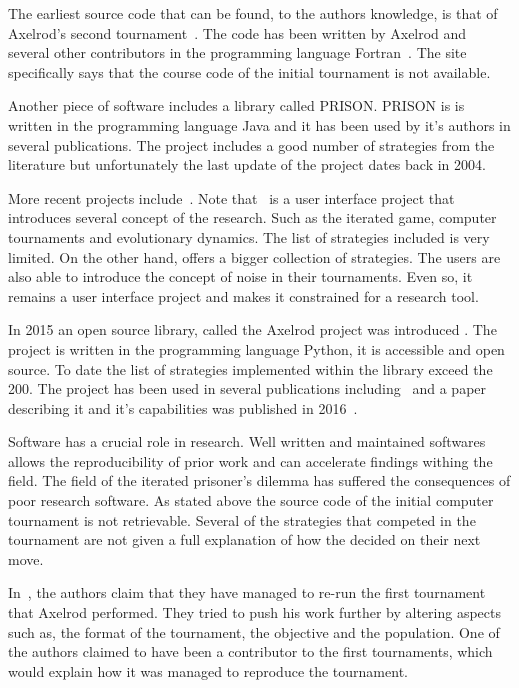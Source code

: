 \documentclass{article}
\begin{document}
The earliest source code that can be found, to the authors knowledge, is that
of Axelrod's second tournament~\cite{axelrod1980b}.  The code has been 
written by Axelrod and several other contributors in the programming 
language Fortran~\cite{fortan_code}. The site specifically says that the course 
code of the initial tournament is not available. 

Another  piece of software includes a library called PRISON. PRISON is 
is written in the programming language Java and it has been used by it's authors
in several publications. The project includes a good number of strategies from
the literature but unfortunately the last update of the project dates back in 2004.

More recent projects include~\cite{pd_trust, pd_game}. Note that~\cite{pd_trust}
is a user interface project that introduces several concept of the research.
Such as the iterated game, computer tournaments and evolutionary
dynamics. The list of strategies included is very limited. On the other hand,
\cite{pd_game} offers a bigger collection of strategies. The users are also
able to introduce the concept of noise in their tournaments. Even so, 
it remains a user interface project and makes it constrained for a research tool. 

In 2015 an open source library, called the Axelrod project was introduced
\cite{axelrodproject}. The project is written in the programming language 
Python, it is accessible and open source. To date the list of strategies implemented
within the library exceed the 200. The project has been used in several
publications including~\cite{Knight2017} and a paper describing it and
it's capabilities was published in 2016~\cite{Knight2016}.

Software has a crucial role in research. Well written and maintained softwares
allows the reproducibility of prior work and can accelerate findings withing the
field. The field of the iterated prisoner's dilemma has suffered the consequences
of poor research software. As stated above the source code of the initial
computer tournament is not retrievable. Several of the strategies that competed
in the tournament are not given a full explanation of how the decided on their
next move. 

In~\cite{Rapoport2015}, the authors claim that they have managed to 
re-run the first tournament that Axelrod performed. They tried to push his work
further by altering aspects such as, the format of the tournament, the objective
and the population. One of the authors claimed to have been a contributor
to the first tournaments, which would explain how it was managed to reproduce
the tournament.
\end{document}
